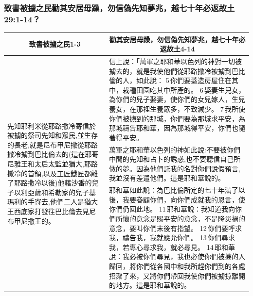 \subsubsection{致書被擄之民勸其安居毋躁，勿信偽先知夢兆，越七十年必返故土 29:1-14？}
\begin{table}[H]
\centering
\begin{tabular}{p{3.7cm}|p{13.50cm}}\hline\hline
\multicolumn{1}{c|}{致書被擄之民1-3}&\multicolumn{1}{c}{勸其安居毋躁，勿信偽先知夢兆，越七十年必返故土4-14}\\\hline
\multirow{3}{4.cm}{先知耶利米從耶路撒冷寄信於被擄的祭司先知和眾民,並生存的長老,就是尼布甲尼撒從耶路撒冷擄到巴比倫去的(這在耶哥尼雅王和太后太監並猶大,耶路撒冷的首領,以及工匠鐵匠都離了耶路撒冷以後)他藉沙番的兒子以利亞薩和希勒家的兒子基瑪利的手寄去,他們二人是猶大王西底家打發往巴比倫去見尼布甲尼撒王的。} 
&信上說：「萬軍之耶和華以色列的神對一切被擄去的，就是我使他們從耶路撒冷被擄到巴比倫的人，如此說： 5 你們要蓋造房屋住在其中，栽種田園吃其中所產的。 6 娶妻生兒女，為你們的兒子娶妻，使你們的女兒嫁人，生兒養女，在那裡生養眾多，不致減少。 7 我所使你們被擄到的那城，你們要為那城求平安，為那城禱告耶和華，因為那城得平安，你們也隨著得平安。\\\cline{2-2}

&萬軍之耶和華以色列的神如此說:不要被你們中間的先知和占卜的誘惑,也不要聽信自己所做的夢。因為他們託我的名對你們說假預言,我並沒有差遣他們。這是耶和華說的。\\\cline{2-2}
&耶和華如此說：為巴比倫所定的七十年滿了以後，我要眷顧你們，向你們成就我的恩言，使你們仍回此地。 11 耶和華說：我知道我向你們所懷的意念是賜平安的意念，不是降災禍的意念，要叫你們末後有指望。 12 你們要呼求我，禱告我，我就應允你們。 13 你們尋求我，若專心尋求我，就必尋見。 14 耶和華說：我必被你們尋見，我也必使你們被擄的人歸回，將你們從各國中和我所趕你們到的各處招聚了來，又將你們帶回我使你們被擄掠離開的地方。這是耶和華說的。\\\hline
\end{tabular}
\end{table}



